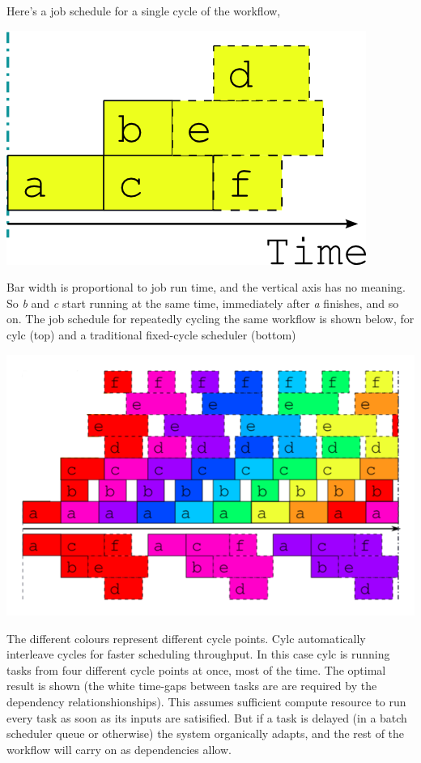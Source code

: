 Here's a job schedule for a single cycle of the workflow,
\begin{center}
    \includegraphics[width=0.17\columnwidth]{resources/tex/timeline-zero.png}
\end{center}

Bar width is proportional to job run time, and the vertical axis has no
meaning.  So {\em b} and {\em c} start running at the same time,
immediately after {\em a} finishes, and so on.  The job schedule for repeatedly
cycling the same workflow is shown below, for cylc (top) and a traditional
fixed-cycle scheduler (bottom) 

\begin{center}
    \includegraphics[width=0.5\columnwidth]{resources/tex/timeline-two}
\end{center}

The different colours represent different cycle points.  Cylc automatically
interleave cycles for faster scheduling throughput. In this case cylc is
running tasks from four different cycle points at once, most of the time. The
optimal result is shown (the white time-gaps between tasks are are required by
the dependency relationshionships). This assumes sufficient compute resource to
run every task as soon as its inputs are satisified. But if a task is delayed
(in a batch scheduler queue or otherwise) the system organically adapts, and
the rest of the workflow will carry on as dependencies allow.
